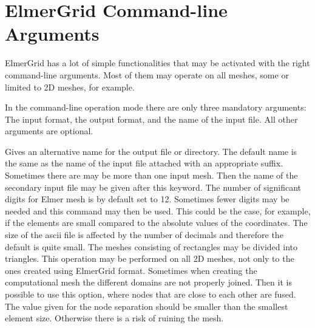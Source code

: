 \section{ElmerGrid Command-line Arguments}

ElmerGrid has a lot of simple functionalities that may be activated 
with the right command-line arguments. Most of them may operate on
all meshes, some or limited to 2D meshes, for example. 

In the command-line operation mode
there are only three mandatory arguments: The input format,
the output format, and the name of the input file.
All other arguments are optional.

\sifbegin
{}
Gives an alternative name for the output file or directory. 
The default name is the same as the name of the input file
attached with an appropriate suffix. 
%
Sometimes there are may be more than one input mesh. 
Then the name of the secondary input file may be given 
after this keyword.
%
The number of significant digits for Elmer mesh is by default set to 12.
Sometimes fewer digits may be needed and this command may then
be used. This could be the case, for example, if the elements are 
small compared to the absolute values of the coordinates.
The size of the ascii file is affected by the number of 
decimals and therefore the default is quite small.
%
The meshes consisting of rectangles may be divided into 
triangles. This operation may be performed on all 2D meshes, 
not only to the ones created using ElmerGrid format.
%
Sometimes when creating the computational mesh the 
different domains are not properly joined. Then it is possible to 
use this option, where nodes that are close to each other are
fused. The value given for the node separation should be smaller than
the smallest element size. Otherwise there is a risk of ruining the mesh.

